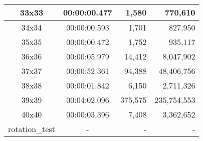 \begin{center}
\begin{tabular}{|c|c|r|r|}
		33x33 & 00:00:00.477 & 1,580 & 770,610 \\ \hline
		34x34 & 00:00:00.593 & 1,701 & 827,950 \\ \hline
		35x35 & 00:00:00.472 & 1,752 & 935,117 \\ \hline
		36x36 & 00:00:05.979 & 14,412 & 8,047,902 \\ \hline
		37x37 & 00:00:52.361 & 94,388 & 48,406,756 \\ \hline
		38x38 & 00:00:01.842 & 6,150 & 2,711,326 \\ \hline
		39x39 & 00:04:02.096 & 375,575 & 235,754,553 \\ \hline
		40x40 & 00:00:03.396 & 7,408 & 3,362,652 \\ \hline
		rotation\_test & - & - & - \\ \hline

    \end{tabular}
\end{center}
